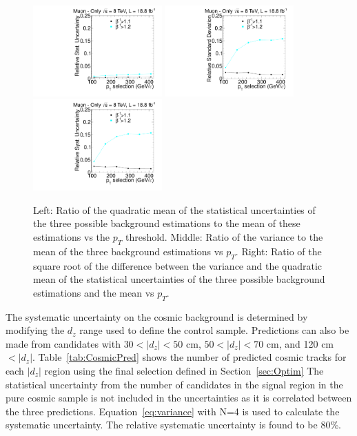 \begin{figure}
\begin{center}
\includegraphics[clip=true, trim=0.0cm 0cm 3.0cm 0cm,width=0.44\textwidth]{figures/muonly/Data8TeVCollisionStat}
\includegraphics[clip=true, trim=0.0cm 0cm 3.0cm 0cm,width=0.44\textwidth]{figures/muonly/Data8TeVCollisionStatSyst} \\
\includegraphics[clip=true, trim=0.0cm 0cm 3.0cm 0cm,width=0.44\textwidth]{figures/muonly/Data8TeVCollisionSyst}
\caption{
Left: Ratio of the quadratic
mean of the statistical uncertainties of the three possible background
estimations to the mean of these estimations vs
the $p_T$ threshold. Middle: Ratio of the variance to the mean of the three
background estimations vs $p_T$. Right: Ratio of the
square root of the difference between the variance and the quadratic
mean of the statistical uncertainties  of the three possible background
estimations and the mean vs $p_T$.
}
\label{fig:MuOnlyUnc}
\end{center}
\end{figure}

The systematic uncertainty on the cosmic background is determined by
modifying the $d_z$ range used to define the control sample.  Predictions
can also be made from candidates with $30 < |d_z| < 50$ cm, $50 < |d_z| < 70$ cm, and
120 cm $< |d_z|$.  Table~\ref{tab:CosmicPred} shows the number of predicted cosmic
tracks for each $|d_z|$ region using the final selection defined in Section~\ref{sec:Optim}
The statistical uncertainty from the number of candidates in the signal region in the
pure cosmic sample is not included in the uncertainties as it is correlated
between the three predictions.
Equation~\ref{eq:variance} with N=4 is used to calculate the systematic uncertainty.
The relative systematic uncertainty is found to be 80\%.

